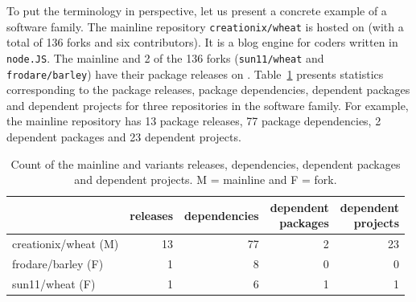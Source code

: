 To put the terminology in perspective, let us present a concrete example of a software family. 
The mainline repository \texttt{creationix/wheat} is hosted on \gh (with a total of 136 forks and six contributors). It is a blog engine for coders written in \texttt{node.JS}. 
The mainline and 2 of the 136 forks (\texttt{sun11/wheat} and \texttt{frodare/barley}) have their package releases on \npm.
Table~\ref{tab:example} presents statistics corresponding to the package releases, package dependencies, dependent packages and dependent projects for three repositories in the software family.
For example, the mainline repository has 13 package releases, 77 package dependencies, 2 dependent packages and 23 dependent projects.

\begin{table}[ht]
\begin{center}
\caption{Count of the mainline and variants releases, dependencies, dependent packages and dependent projects. M = mainline and F = fork.}
\label{tab:example}
\begin{tabular}{l r r r r } 
 \hline
 &releases & dependencies & \shortstack{dependent \\ packages} & \shortstack{dependent \\ projects} \\ \hline
 creationix/wheat (M)  &13 & 77 & 2&23 \\ 
 frodare/barley (F)    &1 & 8 & 0 & 0 \\ 
 sun11/wheat (F)       &1 & 6 & 1 & 1 \\ 
 \hline
\end{tabular}
\end{center}
\end{table}

